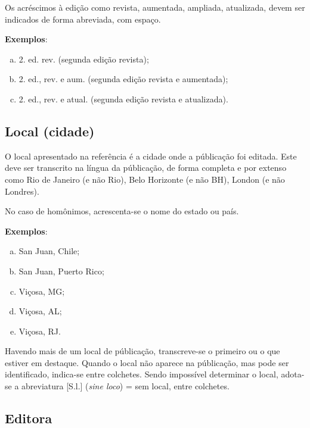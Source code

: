 Os acréscimos à edição como revista, aumentada, ampliada, atualizada, devem ser indicados de forma abreviada, com espaço.

\begin{exemplomanual}
\textbf{Exemplos}:

\begin{enumerate}[a)]
  \item  2. ed. rev. (segunda edição revista);
  \item  2. ed., rev. e aum. (segunda edição revista e aumentada);
  \item  2. ed., rev. e atual. (segunda edição revista e atualizada).
\end{enumerate}
\end{exemplomanual}


\subsection{Local (cidade)}

O local apresentado na referência é a cidade onde a públicação foi editada. Este deve ser transcrito na língua da públicação, de forma completa e por extenso como Rio de Janeiro (e não Rio), Belo Horizonte (e não BH), London (e não Londres).

No caso de homônimos, acrescenta-se o nome do estado ou país.

\begin{exemplomanual}
\textbf{Exemplos}:

\begin{enumerate}[a)]
  \item  San Juan, Chile;
  \item  San Juan, Puerto Rico;
  \item  Viçosa, MG;
  \item  Viçosa, AL;
  \item  Viçosa, RJ.
\end{enumerate}
\end{exemplomanual}

Havendo mais de um local de públicação, transcreve-se o primeiro ou o que estiver em destaque. Quando o local não aparece na públicação, mas pode ser identificado, indica-se entre colchetes. Sendo impossível determinar o local, adota-se a abreviatura [S.l.] (\textit{sine loco}) = sem local, entre colchetes.


\subsection{Editora}

